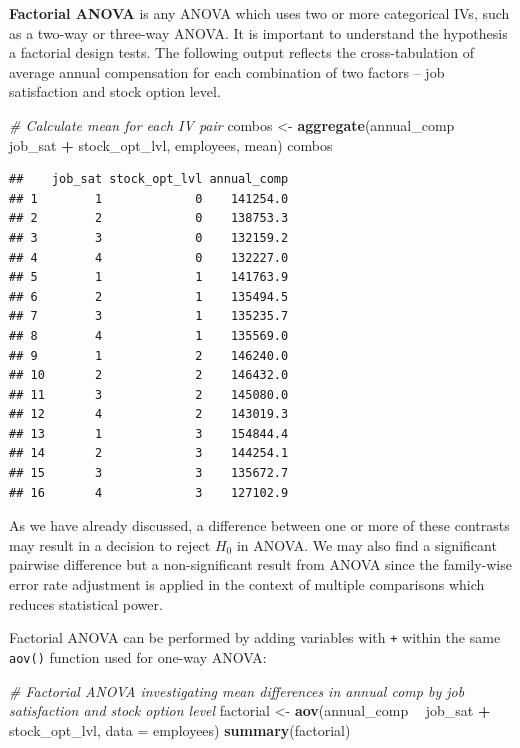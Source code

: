 \documentclass[]{book}
\newenvironment{Shaded}{\begin{snugshade}}{\end{snugshade}}
\newcommand{\CommentTok}[1]{\textcolor[rgb]{0.56,0.35,0.01}{\textit{#1}}}
\newcommand{\DataTypeTok}[1]{\textcolor[rgb]{0.13,0.29,0.53}{#1}}
\newcommand{\KeywordTok}[1]{\textcolor[rgb]{0.13,0.29,0.53}{\textbf{#1}}}
\newcommand{\NormalTok}[1]{#1}
\newcommand{\OperatorTok}[1]{\textcolor[rgb]{0.81,0.36,0.00}{\textbf{#1}}}
\newcommand{\StringTok}[1]{\textcolor[rgb]{0.31,0.60,0.02}{#1}}
\begin{document}
\textbf{Factorial ANOVA} is any ANOVA which uses two or more categorical IVs, such as a two-way or three-way ANOVA. It is important to understand the hypothesis a factorial design tests. The following output reflects the cross-tabulation of average annual compensation for each combination of two factors -- job satisfaction and stock option level.

\begin{Shaded}
\begin{Highlighting}[]
\CommentTok{# Calculate mean for each IV pair}
\NormalTok{combos <-}\StringTok{ }\KeywordTok{aggregate}\NormalTok{(annual_comp }\OperatorTok{~}\StringTok{ }\NormalTok{job_sat }\OperatorTok{+}\StringTok{ }\NormalTok{stock_opt_lvl, employees, mean)}
\NormalTok{combos}
\end{Highlighting}
\end{Shaded}

\begin{verbatim}
##    job_sat stock_opt_lvl annual_comp
## 1        1             0    141254.0
## 2        2             0    138753.3
## 3        3             0    132159.2
## 4        4             0    132227.0
## 5        1             1    141763.9
## 6        2             1    135494.5
## 7        3             1    135235.7
## 8        4             1    135569.0
## 9        1             2    146240.0
## 10       2             2    146432.0
## 11       3             2    145080.0
## 12       4             2    143019.3
## 13       1             3    154844.4
## 14       2             3    144254.1
## 15       3             3    135672.7
## 16       4             3    127102.9
\end{verbatim}

As we have already discussed, a difference between one or more of these contrasts may result in a decision to reject \(H_0\) in ANOVA. We may also find a significant pairwise difference but a non-significant result from ANOVA since the family-wise error rate adjustment is applied in the context of multiple comparisons which reduces statistical power.

Factorial ANOVA can be performed by adding variables with \texttt{+} within the same \texttt{aov()} function used for one-way ANOVA:

\begin{Shaded}
\begin{Highlighting}[]
\CommentTok{# Factorial ANOVA investigating mean differences in annual comp by job satisfaction and stock option level}
\NormalTok{factorial <-}\StringTok{ }\KeywordTok{aov}\NormalTok{(annual_comp }\OperatorTok{~}\StringTok{ }\NormalTok{job_sat }\OperatorTok{+}\StringTok{ }\NormalTok{stock_opt_lvl, }\DataTypeTok{data =}\NormalTok{ employees)}
\KeywordTok{summary}\NormalTok{(factorial)}
\end{Highlighting}
\end{Shaded}
\end{document}

